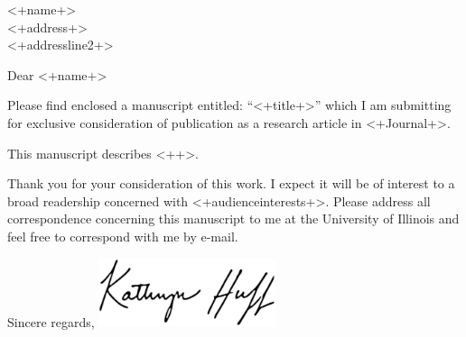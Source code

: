 \documentclass[11pt]{letter} %
\newcommand{\RecipientName}{<+name+>\xspace}
\newcommand{\RecipientAddress}{<+address+>\\
<+addressline2+> \xspace}
\begin{document}



\begin{letter}{\RecipientName \\
        \RecipientAddress}

\address{Kathryn D. Huff\\
118 Talbot Laboratory\\
104 Wright Street\\
MC-234\\
Urbana, IL 61801}


\opening{Dear \RecipientName}


Please find enclosed a manuscript entitled: ``<+title+>'' which I am submitting for exclusive 
consideration of publication as a research article in <+Journal+>.

This manuscript describes <++>.

Thank you for your consideration of this work. I expect it will be of interest
to a broad readership concerned with <+audienceinterests+>.  Please address all
correspondence concerning this manuscript to me at the University of Illinois
and feel free to correspond with me by e-mail.

\closing{Sincere regards,
\includegraphics[height=2cm]{signature}\\
}


\end{letter}
\end{document}
